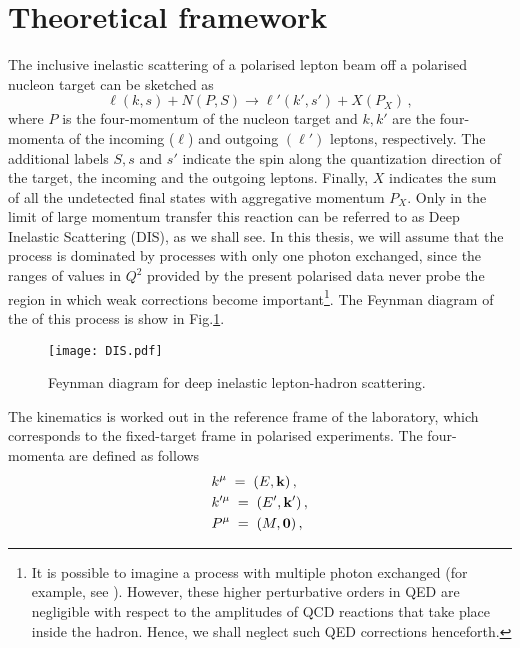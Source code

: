 \section{Theoretical framework}
The inclusive inelastic scattering of a polarised lepton beam off a polarised nucleon target can be sketched as
\begin{equation}
    \ell(k,s) + N(P, S) \longrightarrow \ell'(k',s') + X(P_X) \,,
    \label{eq:DIS}
\end{equation}
where $P$ is the four-momentum of the nucleon target and $k,k'$ are the four-momenta of the incoming ($\ell$) and outgoing $(\ell')$ leptons, respectively. The additional labels $S,s$ and $s'$ indicate the spin along the quantization direction of the target, the incoming and the outgoing leptons. Finally, $X$ indicates the sum of all the undetected final states with aggregative momentum $P_X$. Only in the limit of large momentum transfer this reaction can be referred to as Deep Inelastic Scattering (DIS), as we shall see. In this thesis, we will assume that the process is dominated by processes with only one photon exchanged, since the ranges of values in $Q^2$ provided by the present polarised data never probe the region in which weak corrections become important\footnote{It is possible to imagine a process with multiple photon exchanged (for example, see \cite{leader_predazzi_1996}). However, these higher perturbative orders in QED are negligible with respect to the amplitudes of QCD reactions that take place inside the hadron. Hence, we shall neglect such QED corrections henceforth.}. The Feynman diagram of the of this process is show in Fig.\ref{fig:DIS_Feynamn}.
\begin{figure}[h]
  \centering
  \texttt{[image: DIS.pdf]} 
  \caption{Feynman diagram for deep inelastic lepton-hadron scattering.}
  \label{fig:DIS_Feynamn}
\end{figure}
The kinematics is worked out in the reference frame of the laboratory, which corresponds to the fixed-target frame in polarised experiments. The four-momenta are defined as follows
\begin{equation}
    \begin{split}
        &k^{\mu} \;=\; \left(E, \vb{k} \right), \\
        &k'^{\mu} \;=\; \left(E', \vb{k'} \right), \\
        &P^{\mu} \;=\; \left(M, \vb{0} \right),
    \end{split}
\end{equation}

